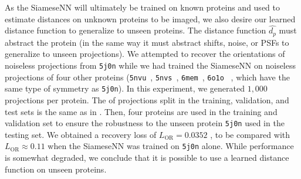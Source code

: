 As the SiameseNN will ultimately be trained on known proteins and used to estimate distances on unknown proteins to be imaged,
we also desire our learned distance function to generalize to unseen proteins.
The distance function $\widehat{d_p}$ must abstract the protein (in the same way it must abstract shifts, noise, or PSFs to generalize to unseen projections).
We attempted to recover the orientations of noiseless projections from \texttt{5j0n} while we had trained the SiameseNN on noiseless projections of four other proteins (\texttt{5nvu}~\cite{5nvu_pdb}, \texttt{5nvs}~\cite{5nvs_pdb}, \texttt{6mem}~\cite{6mem_pdb}, \texttt{6o1o}~\cite{6o1o_pdb} , which have the same type of symmetry as \texttt{5j0n}).
In this experiment, we generated $1,000$ projections per protein.
The  of projections split in the training, validation, and test sets is the same as in .
Then, four proteins are used in the training and validation set to ensure the robustness to the unseen protein \texttt{5j0n} used in the testing set.
We obtained a recovery loss of $L_\text{OR} = 0.0352$ ,
to be compared with $L_\text{OR} \approx 0.11$ when the SiameseNN was trained on \texttt{5j0n} alone.
While performance is somewhat degraded, we conclude that it is possible to use a learned distance function on unseen proteins.

